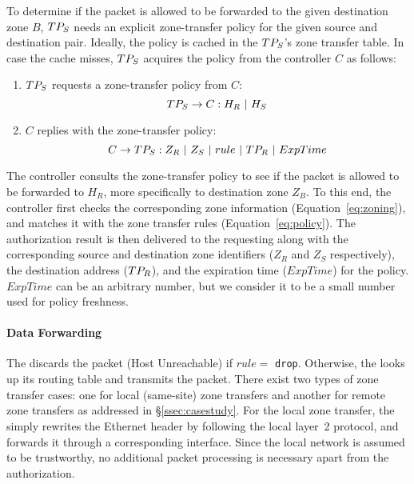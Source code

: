 To determine if the packet is allowed to be forwarded to the given destination zone $B$, $TP_S$
needs an explicit zone-transfer policy for the given source and destination pair. Ideally, 
the policy is cached in the $TP_S$'s zone transfer table. In case the cache misses, $TP_S$ 
acquires the policy from the controller $C$ as follows:

\begin{enumerate}
	\item $TP_S$ requests a zone-transfer policy from $C$:
	\begin{equation}
		TP_S \rightarrow C : H_R~|~H_S
	\label{eq:authreq}
	\end{equation}
	\item $C$ replies with the zone-transfer policy:
	\begin{equation}
		C \rightarrow TP_S : \\
		Z_R~|~Z_S~|~rule~|~TP_R~|~ExpTime
	\label{eq:authrep}
	\end{equation}
\end{enumerate}

The controller consults the zone-transfer policy to see if the packet is allowed to be forwarded
to $H_R$, more specifically to destination zone $Z_B$. To this end, the controller 
first checks the corresponding zone information (Equation~\ref{eq:zoning}), and matches 
it with the zone transfer rules (Equation~\ref{eq:policy}). The authorization result is
then delivered to the requesting \tp along with the corresponding source and destination 
zone identifiers ($Z_R$ and $Z_S$ respectively), the destination \tp address 
($TP_R$), and the expiration time ($ExpTime$) for the policy. $ExpTime$ can be an arbitrary
number, but we consider it to be a small number used for policy freshness.

\paragraph{Data Forwarding}
The \tp discards the packet (Host Unreachable) if $rule=$ \texttt{drop}. Otherwise, 
the \tp looks up its routing table and transmits the packet. There exist two types of 
zone transfer cases: one for local (same-site) zone transfers and another for remote zone 
transfers as addressed in \S\ref{ssec:casestudy}. For the local zone transfer, the \tp 
simply rewrites the Ethernet header by following the local layer~2 protocol, and 
forwards it through a corresponding interface. Since the local network is assumed to
be trustworthy, no additional packet processing is necessary apart from the authorization.

